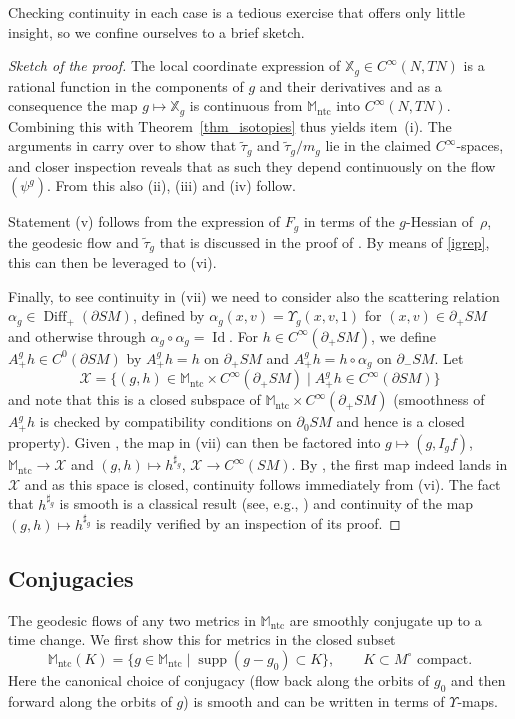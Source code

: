 \documentclass[pdftex]{sigma}
\numberwithin{equation}{section}
\theoremstyle{definition}
\newcommand{\M}{\mathbb{M}}
\newcommand{\1}{{\bf 1}}
\DeclareMathOperator{\supp}{supp}
\newcommand{\Id}{\operatorname{Id}}
\newcommand{\ntc}{\mathrm{ntc}}
\DeclareMathOperator{\Diff}{Diff}
\begin{document}
Checking continuity in each case is a tedious exercise that offers only little insight, so we confine ourselves to a brief sketch.

\begin{proof}[Sketch of the proof] The local coordinate expression of $\mathbb X_g\in C^\infty(N,TN)$ is a rational function in the components of $g$ and their derivatives and as a consequence the map $g\mapsto \mathbb X_g$ is continuous from $\M_\ntc$ into $C^\infty(N,TN)$. Combining this with Theorem~\ref{thm_isotopies} thus yields item~(i).
The arguments in \cite[Section~3.2]{PSU23} carry over to show that $\tilde \tau_g$ and $\tilde \tau_g/m_g$ lie in the claimed $C^\infty$-spaces, and closer inspection reveals that as such they depend continuously on the flow~$(\psi^g)$. From this also (ii), (iii) and (iv) follow.

Statement (v) follows from the expression of $F_g$ in terms of the $g$-Hessian of~$\rho$, the geodesic flow and $\tilde \tau_g$ that is discussed in the proof of \cite[Proposition~6.12]{MNP20}. By means of \eqref{igrep}, this can then be leveraged to (vi).

Finally, to see continuity in (vii) we need to consider also the scattering relation $\alpha_g\in \Diff_+(\partial SM)$, defined by $\alpha_g(x,v)=\Upsilon_g(x,v,1)$ for $(x,v)\in \partial_+SM$ and otherwise through $\alpha_g\circ \alpha_g = \Id$. For $h\in C^\infty(\partial_+SM)$, we define $A_+^gh\in C^0(\partial SM)$ by $A^g_+h = h$ on $\partial_+SM$ and $A_+^g h = h\circ \alpha_g$ on $\partial_-SM$. Let
\[
	\mathcal X = \{(g,h)\in \M_\ntc \times C^\infty(\partial_+SM)\mid A_+^g h \in C^\infty(\partial SM)\}
\]
and note that this is a closed subspace of $\M_\ntc\times C^\infty(\partial_+SM)$ (smoothness of $A_+^g h$ is checked by compatibility conditions on $\partial_0SM$ and hence is a closed property). Given , the map in (vii) can then be factored into
$g\mapsto (g,I_g f)$, $\M_\ntc \rightarrow \mathcal X$ and $ (g,h)\mapsto h^{\sharp_g}$, $\mathcal X\rightarrow C^\infty(SM)$.
By \cite[Proposition 6.13]{MNP20}, the first map indeed lands in $\mathcal X$ and as this space is closed, continuity follows immediately from (vi). The fact that $h^{\sharp_g}$ is smooth is a classical result (see, e.g., \cite[Theorem 5.1.1]{PSU23}) and continuity of the map $(g,h)\mapsto h^{\sharp_g}$ is readily verified by an inspection of its proof.
\end{proof}


\subsection{Conjugacies} The geodesic flows of any two metrics in $\M_\ntc$ are smoothly conjugate up to a time change. We first show this for metrics in the closed subset
\begin{equation}\label{def_mntck}
	\M_\ntc(K) = \{g\in \M_\ntc\mid \supp(g-g_0)\subset K\},\qquad K\subset M^\circ \text{ compact}.
\end{equation}
Here the canonical choice of conjugacy (flow back along the orbits of $g_0$ and then forward along the orbits of $g$) is smooth and can be written in terms of $\Upsilon$-maps.
\end{document}
